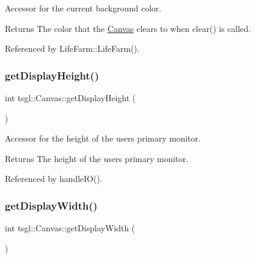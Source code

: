 Accessor for the current background color. 

\begin{DoxyReturn}{Returns}
The color that the \hyperlink{classtsgl_1_1_canvas}{Canvas} clears to when clear() is called. 
\end{DoxyReturn}


Referenced by Life\+Farm\+::\+Life\+Farm().

\mbox{\label{classtsgl_1_1_canvas_a664b101f972845eaf5fdc4d9e664e623}} 
\subsubsection{\texorpdfstring{get\+Display\+Height()}{getDisplayHeight()}}
{\footnotesize\ttfamily int tsgl\+::\+Canvas\+::get\+Display\+Height (\begin{DoxyParamCaption}{ }\end{DoxyParamCaption})\hspace{0.3cm}{\ttfamily [static]}}



Accessor for the height of the user\textquotesingle{}s primary monitor. 

\begin{DoxyReturn}{Returns}
The height of the user\textquotesingle{}s primary monitor. 
\end{DoxyReturn}


Referenced by handle\+I\+O().

\mbox{\label{classtsgl_1_1_canvas_abbe5c392cac2320fecf1f2751afb207c}} 
\subsubsection{\texorpdfstring{get\+Display\+Width()}{getDisplayWidth()}}
{\footnotesize\ttfamily int tsgl\+::\+Canvas\+::get\+Display\+Width (\begin{DoxyParamCaption}{ }\end{DoxyParamCaption})\hspace{0.3cm}{\ttfamily [static]}}



